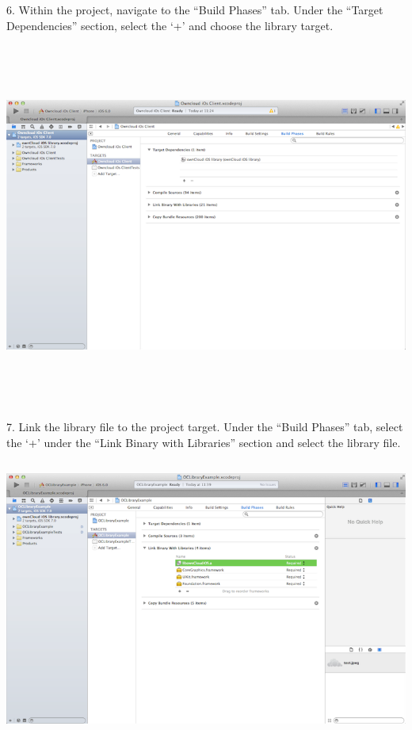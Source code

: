 \documentclass[letterpaper,10pt,english]{sphinxmanual}
\begin{document}
6. Within the project, navigate to the “Build Phases” tab.  Under the “Target
Dependencies” section, select the ‘+’ and choose the library target.

\includegraphics[width=16.51cm,height=12.023cm]{100000000000030C000001E7A7A01884.png}

7.  Link the library file to the project target.  Under the “Build Phases” tab,
select the ‘+’ under the “Link Binary with Libraries” section and select the
library file.

\includegraphics[width=14.605cm,height=9.137cm]{100000000000030C000001E8AB4C3306.png}
\end{document}
